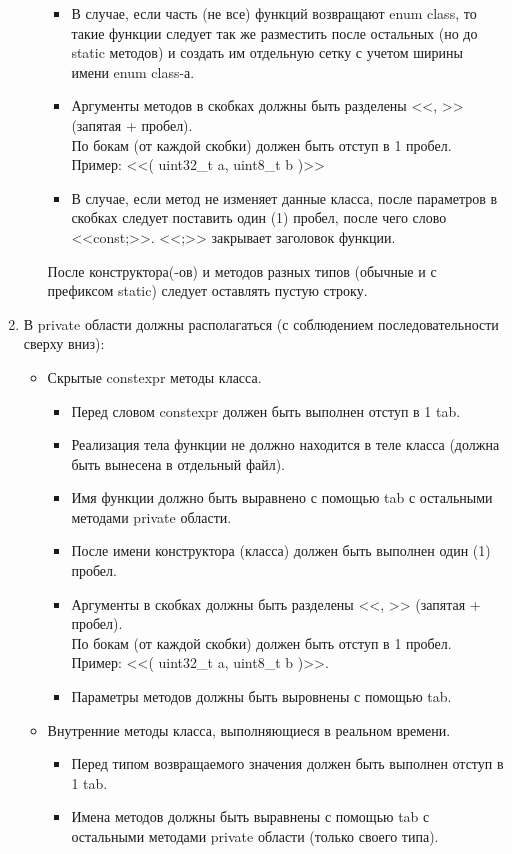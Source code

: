 \begin{enumerate}
\begin{itemize}
\begin{itemize}
			\item В случае, если часть (не все) функций возвращают enum class, то такие функции следует так же разместить после остальных (но до static методов) и создать им отдельную сетку с учетом ширины имени enum class-а.
			\item Аргументы методов в скобках должны быть разделены <<, >> (запятая + пробел).\\По бокам (от каждой скобки) должен быть отступ в 1 пробел.\\Пример: <<( uint32\_t a, uint8\_t b )>>
			\item В случае, если метод не изменяет данные класса, после параметров в скобках следует поставить один (1) пробел, после чего слово <<const;>>. <<;>> закрывает заголовок функции.
		\end{itemize}
		После конструктора(-ов) и методов разных типов (обычные и с префиксом static) следует оставлять пустую строку. 
	\end{itemize}
	\item В private области должны располагаться (с соблюдением последовательности сверху вниз):
	\begin{itemize}
	\item Скрытые constexpr методы класса.
	\begin{itemize}
		\item Перед словом constexpr должен быть выполнен отступ в 1 tab.
		\item Реализация тела функции не должно находится в теле класса (должна быть вынесена в отдельный файл).
		\item Имя функции должно быть выравнено с помощью tab с остальными методами private области.
		\item После имени конструктора (класса) должен быть выполнен один (1) пробел. 
		\item Аргументы в скобках должны быть разделены <<, >> (запятая + пробел).\\По бокам (от каждой скобки) должен быть отступ в 1 пробел.\\Пример: <<( uint32\_t a, uint8\_t b )>>.
		\item Параметры методов должны быть выровнены с помощью tab.
	\end{itemize}
	\item Внутренние методы класса, выполняющиеся в реальном времени.
	\begin{itemize}
		\item Перед типом возвращаемого значения должен быть выполнен отступ в 1 tab.
		\item Имена методов должны быть выравнены с помощью tab с остальными методами private области (только своего типа).

\end{itemize}
\end{itemize}
\end{enumerate}
